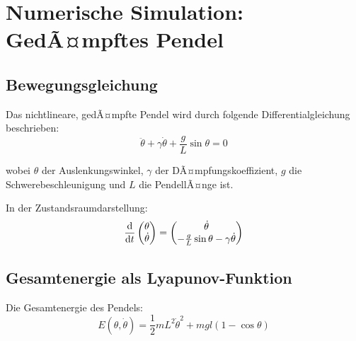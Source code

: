 ﻿\documentclass[12pt, a4paper]{report}
\theoremstyle{definition}
\theoremstyle{remark}
\begin{document}
\chapter{Numerische Simulation: GedÃ¤mpftes Pendel}
\label{sec:numerik}

\section{Bewegungsgleichung}

Das nichtlineare, gedÃ¤mpfte Pendel wird durch folgende Differentialgleichung
beschrieben:
\begin{equation}
  \ddot\theta + \gamma\dot\theta + \frac{g}{L}\sin\theta = 0
  \label{eq:pendel_ode}
\end{equation}

wobei $\theta$ der Auslenkungswinkel, $\gamma$ der DÃ¤mpfungskoeffizient,
$g$ die Schwerebeschleunigung und $L$ die PendellÃ¤nge ist.

In der Zustandsraumdarstellung:
\begin{equation}
  \dv{}{t}\begin{pmatrix}\theta\\\dot\theta\end{pmatrix}
  = \begin{pmatrix}\dot\theta\\-\frac{g}{L}\sin\theta - \gamma\dot\theta\end{pmatrix}
  \label{eq:pendel_ode_state}
\end{equation}

\section{Gesamtenergie als Lyapunov-Funktion}

Die Gesamtenergie des Pendels:
\begin{equation}
  E(\theta, \dot\theta) = \frac{1}{2}mL^2\dot\theta^2 + mgl(1 - \cos\theta)
  \label{eq:pendel_energie}
\end{equation}
\end{document}
